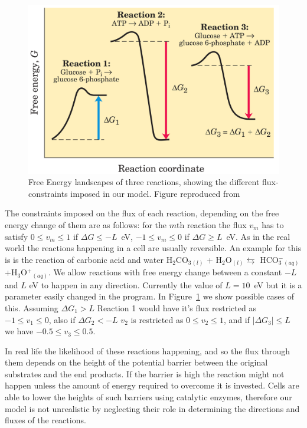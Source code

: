 \documentclass[a4paper,12pt]{article}
\begin{document}
	\begin{figure}[htpb]
		\centering
		\includegraphics[width=0.6\linewidth]{freeEchangeFig.png}
		\caption{Free Energy landscapes of three reactions, showing the different flux-constraints imposed in our model. Figure reproduced from \cite{principlesofbio}}
		\label{fig:freeEchangeFig}
	\end{figure}

	The constraints imposed on the flux of each reaction, depending on the free energy change of them are as follows: for the $m$th reaction the flux $v_m$ has to satisfy $0\leq v_m \leq 1 $ if $\Delta G \leq -L$~eV, $-1\leq v_m \leq 0 $ if $\Delta G \geq L$~eV. As in the real world the reactions happening in a cell are usually reversible.  An example for this is is the reaction of carbonic acid and water H$_2$CO$_3$$_{(l)}$ + H$_2$O$_{(l)} \leftrightarrows$ HCO$^-_3$$_{(aq)}$+H$_3$O$^+$$_{(aq)}$. We allow reactions with free energy change between a constant $-L$ and $L$ eV to happen in any direction. Currently the value of $L=10$~eV but it is a parameter easily changed in the program. In Figure~\ref{fig:freeEchangeFig} we show possible cases of this. Assuming $\Delta G_1 > L$ Reaction 1 would have it's flux restricted as $-1\leq v_1 \leq 0$, also if $\Delta G_2 < -L$ $v_2$ is restricted as $0 \leq v_2 \leq 1$, and if $|\Delta G_3 | \leq L$ we have $-0.5 \leq v_3 \leq 0.5$. 

	In real life the likelihood of these reactions happening, and so the flux through them depends on the height of the potential barrier between the original substrates and the end products. If the barrier is high the reaction might not happen unless the amount of energy required to overcome it is invested. Cells are able to lower the heights of such barriers using catalytic enzymes, therefore our model is not unrealistic by neglecting their role in determining the directions and fluxes of the reactions. 
\end{document}

